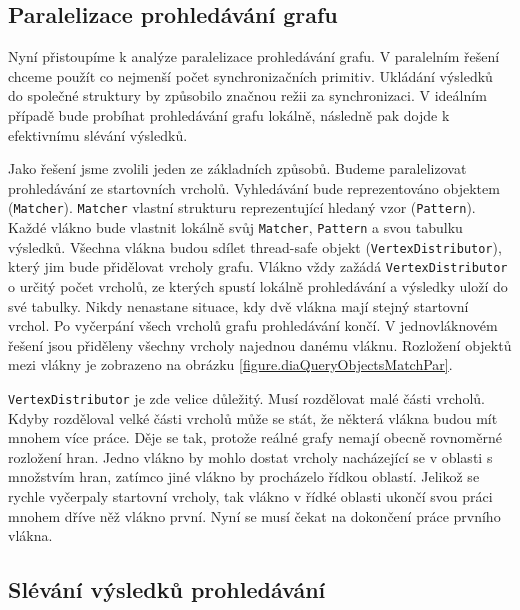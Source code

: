 \subsection{Paralelizace prohledávání grafu} \label{anal.matchPar}

Nyní přistoupíme k analýze paralelizace prohledávání grafu.
V paralelním řešení chceme použít co nejmenší počet synchronizačních primitiv.
Ukládání výsledků do společné struktury by způsobilo značnou režii za synchronizaci.
V ideálním případě bude probíhat prohledávání grafu lokálně, následně pak dojde k efektivnímu slévání výsledků.

Jako řešení jsme zvolili jeden ze základních způsobů.
Budeme paralelizovat prohledávání ze startovních vrcholů.
Vyhledávání bude reprezentováno objektem (\texttt{Matcher}).
\texttt{Matcher} vlastní strukturu reprezentující hledaný vzor (\texttt{Pattern}).
Každé vlákno bude vlastnit lokálně svůj \texttt{Matcher}, \texttt{Pattern} a svou tabulku výsledků.
Všechna vlákna budou sdílet thread-safe objekt (\texttt{VertexDistributor}), který jim bude přidělovat vrcholy grafu.
Vlákno vždy zažádá \texttt{VertexDistributor} o určitý počet vrcholů, ze kterých spustí lokálně prohledávání a výsledky uloží do své tabulky.
Nikdy nenastane situace, kdy dvě vlákna mají stejný startovní vrchol.
Po vyčerpání všech vrcholů grafu prohledávání končí.
V jednovláknovém řešení jsou přiděleny všechny vrcholy najednou danému vláknu. 
Rozložení objektů mezi vlákny je zobrazeno na obrázku \ref{figure.diaQueryObjectsMatchPar}. 

\texttt{VertexDistributor} je zde velice důležitý.
Musí rozdělovat malé části vrcholů.
Kdyby rozděloval velké části vrcholů může se stát, že některá vlákna budou mít mnohem více práce.
Děje se tak, protože reálné grafy nemají obecně rovnoměrné rozložení hran.
Jedno vlákno by mohlo dostat vrcholy nacházející se v oblasti s množstvím hran, zatímco jiné vlákno by procházelo řídkou oblastí.
Jelikož se rychle vyčerpaly startovní vrcholy, tak vlákno v řídké oblasti ukončí svou práci mnohem dříve něž vlákno první.
Nyní se musí čekat na dokončení práce prvního vlákna.

\subsection{Slévání výsledků prohledávání} \label{anal.match.merge}

